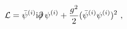 \begin{equation}
{\cal L}= \bar{\psi}^{(i)} {\rm i} \partial \!\!\!/ \, \psi^{(i)} +
\frac{g^2}{2} (\bar{\psi}^{(i)}\psi^{(i)})^2 \ ,
\label{eq11p}
\end{equation} 
